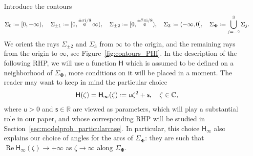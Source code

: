 \documentclass[reqno,a4paper,11pt]{amsart}
\DeclareMathOperator{\re}{Re}
\DeclareMathOperator{\ee}{\rm e}
\newcommand{\C}{\mathbb{C}}
\newcommand{\R}{\mathbb{R}}
\newcommand{\ii}{\mathrm{i}}
\newcommand*{\deff}{\mathrel{\vcenter{\baselineskip0.5ex \lineskiplimit0pt
                     \hbox{\scriptsize.}\hbox{\scriptsize.}}}%
                     =}
\renewcommand{\bm}{\mathbf}
\newcommand{\msf}{\mathsf}
\newcommand{\sad}{\msf s}
\newcommand{\uad}{\msf u}
\theoremstyle{definition}
\theoremstyle{remark}
\numberwithin{equation}{section}
\begin{document}
Introduce the contours
%
$$
\Sigma_0\deff [0,+\infty), \quad \Sigma_{\pm 1}\deff [0,\ee^{\pm \pi\ii/8}\infty),\quad \Sigma_{\pm 2}\deff [0,\ee^{\pm 7\pi \ii/8}),\quad \Sigma_3\deff (-\infty,0],\quad \Sigma_{\bm \Phi}\deff \bigcup_{j=-2}^3 \Sigma_j.
$$
%
We orient the rays $\Sigma_{\pm 2}$ and $\Sigma_{3}$ from $\infty$ to the origin, and the remaining rays from the origin to $\infty$, see Figure~\ref{fig:contours_PHI}. In the description of the following RHP, we will use a function $\msf H$ which is assumed to be defined on a neighborhood of $\Sigma_{\bm \Phi}$, more conditions on it will be placed in a moment. The reader may want to keep in mind the particular choice
%
$$
\msf H(\zeta)=\msf H_\infty(\zeta)\deff \uad \zeta^2+\sad,\quad \zeta\in \C,
$$
%
where $\uad> 0$ and $\sad\in \R$ are viewed as parameters, which will play a substantial role in our paper, and whose corresponding RHP will be studied in Section~\ref{sec:modelprob_particularcase}. In particular, this choice $\msf H_\infty$ also explains our choice of angles for the arcs of $\Sigma_{\bm \Phi}$: they are such that $\re\msf H_\infty(\zeta)\to +\infty$ as $\zeta\to \infty$ along $\Sigma_{\bm\Phi}$.
\end{document}
